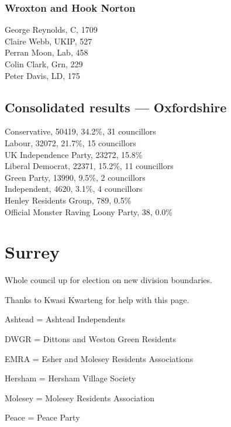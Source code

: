 \documentclass[a4paper,openany,10pt]{book}
\begin{document}
\subsubsection*{Wroxton and Hook Norton}



George Reynolds, C, 1709\\
Claire Webb, UKIP, 527\\
Perran Moon, Lab, 458\\
Colin Clark, Grn, 229\\
Peter Davis, LD, 175\\




\subsection*{Consolidated results --- Oxfordshire}
Conservative, 50419, 34.2\%, 31 councillors\\
Labour, 32072, 21.7\%, 15 councillors\\
UK Independence Party, 23272, 15.8\% \\
Liberal Democrat, 22371, 15.2\%, 11 councillors\\
Green Party, 13990, 9.5\%, 2 councillors\\
Independent, 4620, 3.1\%, 4 councillors\\
Henley Residents Group, 789, 0.5\% \\
Official Monster Raving Loony Party, 38, 0.0\% \\


\vfill

\section{Surrey}

Whole council up for election on new division boundaries.

Thanks to Kwasi Kwarteng for help with this page.

Ashtead = Ashtead Independents

DWGR = Dittons and Weston Green Residents

EMRA = Esher and Molesey Residents Associations

Hersham = Hersham Village Society

Molesey = Molesey Residents Association

Peace = Peace Party
\end{document}
